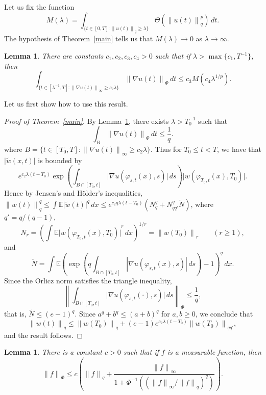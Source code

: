 \documentclass[12pt]{amsart}
\newtheorem{lemma}[thm]{Lemma}
\theoremstyle{remark}
\newcommand{\E}{{\mathbb E}}
\newcommand{\modo}[1]{{\left|#1\right|}}
\newcommand{\normo}[1]{{\left\|#1\right\|}}
\newcommand{\smodo}[1]{{\mathopen|#1\mathclose|}}
\newcommand{\snormo}[1]{{\mathopen\|#1\mathclose\|}}
\begin{document}
Let us fix the function
$$ M(\lambda) = 
   \int_{\{t\in[0,T] \colon \snormo{u(t)}_q \ge \lambda\}}
   \Theta(\snormo{u(t)}_q^p) \, dt .$$
The hypothesis of Theorem~\ref{main} tells us that
 $M(\lambda) \to 0$ as $\lambda \to \infty$.

\begin{lemma}
\label{localization to integral}
There are constants $c_1,c_2,c_3,c_4>0$ 
such that if
$\lambda>\max\{c_1,T^{-1}\}$,
then
$$ \int_{\{t \in [\lambda^{-1},T] \colon
         \snormo{\nabla u(t)}_\infty \ge c_2 \lambda\}}
   \snormo{\nabla u(t)}_{\Phi} \, dt \le c_3 M(c_4\lambda^{1/p}) .$$
\end{lemma}

Let us first show how to use this result.

\begin{proof}[Proof of Theorem~\ref{main}]
By Lemma~\ref{localization to integral}, there exists $\lambda>T_0^{-1}$ such
that
$$ \int_{B}
   \snormo{\nabla u(t)}_{\Phi} \, dt \le \frac1q .$$
where 
$B = \{t \in [T_0,T] \colon \snormo{\nabla u(t)}_\infty \ge c_2 \lambda\}$.
Thus for $T_0 \le t < T$, we have that $\smodo{\tilde w(x,t)}$ is bounded
by
$$ e^{c_2 \lambda (t-T_0)}
   \exp\left(\int_{B\cap[T_0,t]} 
   \smodo{\nabla u(\varphi_{s,t}(x),s)} \, ds\right)
   \smodo{w(\varphi_{T_0,t}(x),T_0)} .$$
Hence by Jensen's and
H\"older's inequalities, $\snormo{w(t)}_{q}^{q} \le 
\int \E\smodo{\tilde w(t)}^{q} \, dx \le 
e^{c_2 q \lambda (t-T_0)}(N_q^q + N_{qq'}^q \tilde N)$, where
$q' = q/(q-1)$, 
$$
   N_r
   =
   \left(\int \E \smodo{w(\varphi_{T_0,t}(x),T_0)}^r\,dx\right)^{1/r} 
   = \snormo{w(T_0)}_r \qquad (r \ge 1), $$
and
$$
   \tilde N
   =
   \int \E \left(
   \exp\left(q\int_{B \cap [T_0,t]}
   \modo{\nabla u(\varphi_{s,t}(x),s)} \, ds \right) - 1 \right)^q
   \, dx .
$$
Since the Orlicz norm satisfies the triangle inequality, 
$$ \normo{\int_{B\cap[T_0,t]} \smodo{\nabla u(\varphi_{s,t}(\cdot),s)} \, ds}
    _\Phi \le \frac1q ,$$
that is, $\tilde N \le (e-1)^q $.
Since $a^q + b^q \le (a+b)^q$ for $a,b \ge 0$,
we conclude that 
$$ \snormo{w(t)}_q \le \snormo{w(T_0)}_q + 
   (e-1) e^{c_2 \lambda (t-T_0)} \snormo{w(T_0)}_{qq'} ,$$
and the result follows.
\end{proof}

\begin{lemma}  \label{upper bound for L_Phi}
There is a constant $c>0$ such that if $f$ is a measurable
function, then
$$
  \snormo f_\Phi \le c
  \left(\snormo f_q + 
  \frac{\snormo f_\infty}{1+\Phi^{-1}(({\snormo f_\infty}/{\snormo f_q})^q)}
  \right) .$$
\end{lemma}
\end{document}
